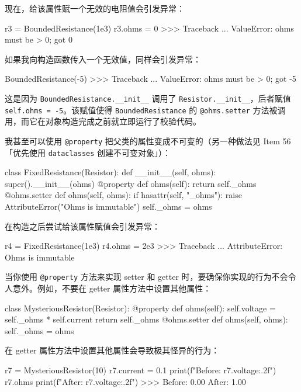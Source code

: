 现在，给该属性赋一个无效的电阻值会引发异常：

\begin{codebox}[python]
r3 = BoundedResistance(1e3)
r3.ohms = 0
>>>
Traceback ...
ValueError: ohms must be > 0; got 0
\end{codebox}

如果我向构造函数传入一个无效值，同样会引发异常：

\begin{codebox}[python]
BoundedResistance(-5)
>>>
Traceback ...
ValueError: ohms must be > 0; got -5
\end{codebox}

这是因为 \texttt{BoundedResistance.\_\_init\_\_} 调用了 \texttt{Resistor.\_\_init\_\_}，后者赋值 \texttt{self.ohms = -5}。该赋值使得 \texttt{BoundedResistance} 的 \texttt{@ohms.setter} 方法被调用，而它在对象构造完成之前就立即运行了校验代码。

我甚至可以使用 \texttt{@property} 把父类的属性变成不可变的（另一种做法见 Item 56「优先使用 \texttt{dataclasses} 创建不可变对象」）：

\begin{codebox}[python]
class FixedResistance(Resistor):
    def __init__(self, ohms):
        super().__init__(ohms)
    @property
    def ohms(self):
        return self._ohms
    @ohms.setter
    def ohms(self, ohms):
        if hasattr(self, "_ohms"):
            raise AttributeError("Ohms is immutable")
        self._ohms = ohms
\end{codebox}

在构造之后尝试给该属性赋值会引发异常：

\begin{codebox}[python]
r4 = FixedResistance(1e3)
r4.ohms = 2e3
>>>
Traceback ...
AttributeError: Ohms is immutable
\end{codebox}

当你使用 \texttt{@property} 方法来实现 setter 和 getter 时，要确保你实现的行为不会令人意外。例如，不要在 getter 属性方法中设置其他属性：

\begin{codebox}[python]
class MysteriousResistor(Resistor):
    @property
    def ohms(self):
        self.voltage = self._ohms * self.current
        return self._ohms
    @ohms.setter
    def ohms(self, ohms):
        self._ohms = ohms
\end{codebox}

在 getter 属性方法中设置其他属性会导致极其怪异的行为：

\begin{codebox}[python]
r7 = MysteriousResistor(10)
r7.current = 0.1
print(f"Before: {r7.voltage:.2f}")
r7.ohms
print(f"After:  {r7.voltage:.2f}")
>>>
Before: 0.00
After:  1.00
\end{codebox}

